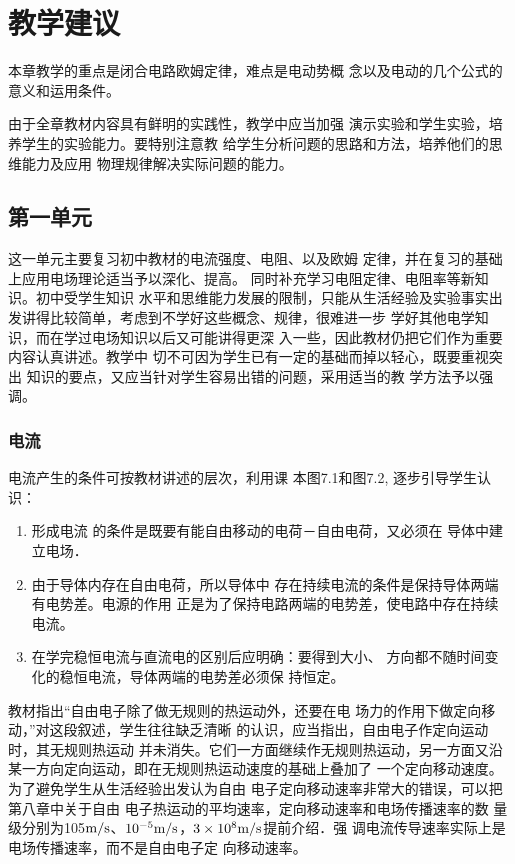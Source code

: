 \section{教学建议}
本章教学的重点是闭合电路欧姆定律，难点是电动势概
念以及电动的几个公式的意义和运用条件。

由于全章教材内容具有鲜明的实践性，教学中应当加强
演示实验和学生实验，培养学生的实验能力。要特别注意教
给学生分析问题的思路和方法，培养他们的思维能力及应用
物理规律解决实际问题的能力。


\subsection{第一单元}
这一单元主要复习初中教材的电流强度、电阻、以及欧姆
定律，并在复习的基础上应用电场理论适当予以深化、提高。
同时补充学习电阻定律、电阻率等新知识。初中受学生知识
水平和思维能力发展的限制，只能从生活经验及实验事实出
发讲得比较简单，考虑到不学好这些概念、规律，很难进一步
学好其他电学知识，而在学过电场知识以后又可能讲得更深
入一些，因此教材仍把它们作为重要内容认真讲述。教学中
切不可因为学生已有一定的基础而掉以轻心，既要重视突出
知识的要点，又应当针对学生容易出错的问题，采用适当的教
学方法予以强调。

\subsubsection{电流}

电流产生的条件可按教材讲述的层次，利用课
本图7.1和图7.2, 逐步引导学生认识：
\begin{enumerate}
\item 形成电流
的条件是既要有能自由移动的电荷－自由电荷，又必须在
导体中建立电场．    \item 由于导体内存在自由电荷，所以导体中
存在持续电流的条件是保持导体两端有电势差。电源的作用
正是为了保持电路两端的电势差，使电路中存在持续电流。
\item 在学完稳恒电流与直流电的区别后应明确：要得到大小、
方向都不随时间变化的稳恒电流，导体两端的电势差必须保
持恒定。
\end{enumerate}

教材指出“自由电子除了做无规则的热运动外，还要在电
场力的作用下做定向移动，”对这段叙述，学生往往缺乏清晰
的认识，应当指出，自由电子作定向运动时，其无规则热运动
并未消失。它们一方面继续作无规则热运动，另一方面又沿
某一方向定向运动，即在无规则热运动速度的基础上叠加了
一个定向移动速度。为了避免学生从生活经验出发认为自由
电子定向移动速率非常大的错误，可以把第八章中关于自由
电子热运动的平均速率，定向移动速率和电场传播速率的数
量级分别为105$\text{m}/\text{s}$、$10^{-5}\text{m}/\text{s}$，$3\times10^8\text{m}/\text{s}$提前介绍．强
调电流传导速率实际上是电场传播速率，而不是自由电子定
向移动速率。

